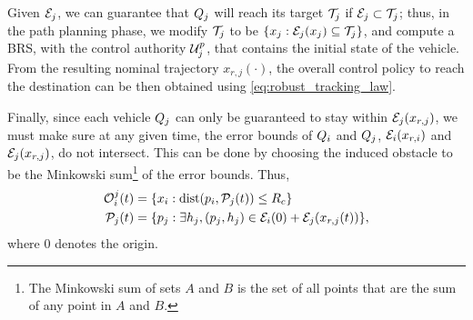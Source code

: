 Given $\mathcal{E}_j$, we can guarantee that $Q_j$ will reach its target $\mathcal{T}_j$ if $\mathcal{E}_j \subset \mathcal{T}_j$; thus, in the path planning phase, we modify $\mathcal{T}_j$ to be $\{x_j: \mathcal{E}_j(x_j) \subseteq \mathcal{T}_j\}$, and compute a BRS, with the control authority $\mathcal{U}^p_j$, that contains the initial state of the vehicle. From the resulting nominal trajectory $x_{r,j}(\cdot)$, the overall control policy to reach the destination can be then obtained using \eqref{eq:robust_tracking_law}.

Finally, since each vehicle $Q_j$ can only be guaranteed to stay within $\mathcal{E}_j(x_{r,j})$, we must make sure at any given time, the error bounds of $Q_i$ and $Q_j$, $\mathcal{E}_i(x_{r,i})$ and $\mathcal{E}_j(x_{r,j})$, do not intersect. This can be done by choosing the induced obstacle to be the Minkowski sum\footnote{The Minkowski sum of sets $A$ and $B$ is the set of all points that are the sum of any point in $A$ and $B$.} of the error bounds. Thus,
\vspace{-0.3em}
\begin{equation}
\begin{aligned}
\mathcal{O}_i^j(t) &= \{x_i: \text{dist}(p_i, \mathcal{P}_j(t)) \le R_c \} \\
\mathcal{P}_j(t) &= \{p_j: \exists h_j, (p_j, h_j) \in \mathcal{E}_i(0) + \mathcal{E}_j(x_{r,j}(t)) \},
\end{aligned}
\end{equation}
\noindent where $0$ denotes the origin. 



